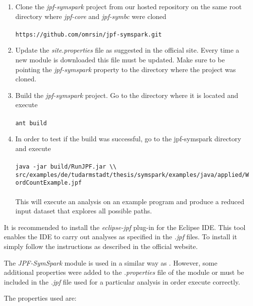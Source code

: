 \begin{enumerate}
	\item Clone the \textit{jpf-symspark} project from our hosted repository on the same root directory where \textit{jpf-core} and \textit{jpf-symbc} were cloned \\ \\
	\lstinline[]|https://github.com/omrsin/jpf-symspark.git|
	\item Update the \textit{site.properties} file as suggested in the official \jpf{} site. Every time a new module is downloaded this file must be updated. Make sure to be pointing the \textit{jpf-symspark} property to the directory where the project was cloned.	
	\item Build the \textit{jpf-symspark} project. Go to the directory where it is located and execute \\ \\		
	\lstinline[]|ant build|	
	\item In order to test if the build was successful, go to the jpf-symspark directory and execute \\ \\
		\lstinline[]|java -jar build/RunJPF.jar \\| \\
		\hspace{2cm} \lstinline[]|src/examples/de/tudarmstadt/thesis/symspark/examples/java/applied/WordCountExample.jpf| \\ \\
	This will execute an analysis on an example program and produce a reduced input dataset that explores all possible paths.
\end{enumerate}

It is recommended to install the \textit{eclipse-jpf} plug-in for the Eclipse IDE. This tool enables the IDE to carry out analyses as specified in the \textit{.jpf} files. To install it simply follow the instructions as described in the official \jpf{} website. 


The \textit{JPF-SymSpark} module is used in a similar way as \spf{}. However, some additional properties were added to the \textit{.properties} file of the module or must be included in the \textit{.jpf} file used for a particular analysis in order execute correctly.

The properties used are:

